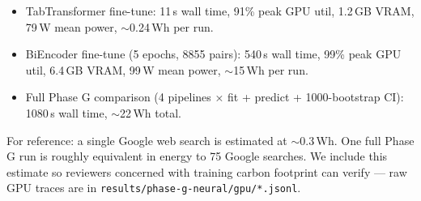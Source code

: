 \begin{itemize}
    \item TabTransformer fine-tune: 11\,s wall time, 91\% peak GPU util, 1.2\,GB VRAM, 79\,W mean power, $\sim$0.24\,Wh per run.
    \item BiEncoder fine-tune (5 epochs, 8855 pairs): 540\,s wall time, 99\% peak GPU util, 6.4\,GB VRAM, 99\,W mean power, $\sim$15\,Wh per run.
    \item Full Phase G comparison (4 pipelines × fit + predict + 1000-bootstrap CI): 1080\,s wall time, $\sim$22\,Wh total.
\end{itemize}

For reference: a single Google web search is estimated at $\sim$0.3\,Wh. One full Phase G run is roughly equivalent in energy to 75 Google searches. We include this estimate so reviewers concerned with training carbon footprint can verify --- raw GPU traces are in \texttt{results/phase-g-neural/gpu/*.jsonl}.

